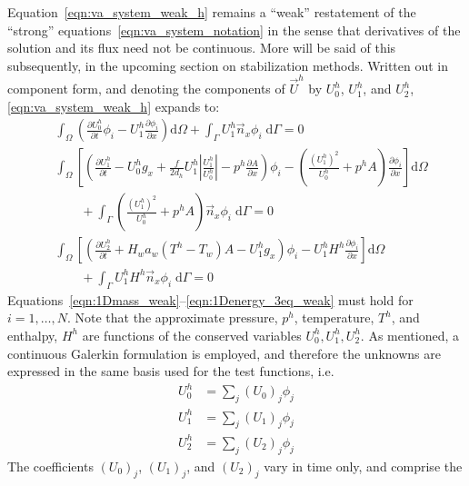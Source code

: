 Equation~\eqref{eqn:va_system_weak_h} remains a ``weak'' restatement of the ``strong'' 
equations~\eqref{eqn:va_system_notation} in the sense that derivatives of the  
solution and its flux need not be continuous. More will be said of this subsequently,
in the upcoming section on stabilization methods.  Written out in component form,
and denoting the components of $\vec{U}^h$ by $U_0^h$, $U_1^h$, and
$U_2^h$, \eqref{eqn:va_system_weak_h} expands to:
\begin{align}
  \label{eqn:1Dmass_weak}
  &
  \int_{\Omega} \left( \frac{\partial U_0^h}{\partial t} \phi_i -
    U_1^h \frac{\partial \phi_i}{\partial x} \right) \text{d}{\Omega}
  + \int_{\Gamma} U_1^h \vec{n}_x \phi_i \; \text{d}{\Gamma} = 0
  \\[12pt]
  \nonumber
  &
  \int_{\Omega} \left[ \left(\frac{\partial U_1^h}{\partial t}
      - U_0^h g_x + \frac{f}{2 d_h}  U_1^h \left|\frac{U_1^h}{U_0^h}\right| - p^h \frac{\partial A}{\partial x} \right) \phi_i
    - \left( \frac{(U_1^h)^2}{U_0^h} + p^hA \right) \frac{\partial\phi_i }{\partial x} \right] \text{d}{\Omega}
  \\
  \label{eqn:1Dmomentum_weak}
  &\qquad + \int_{\Gamma} \left( \frac{(U_1^h)^2}{U_0^h} + p^hA \right) \vec{n}_x \phi_i \; \text{d}{\Gamma} = 0
  \\[12pt]
  \nonumber
  &
  \int_{\Omega}
  \left[
  \left(
    \frac{\partial U_2^h}{\partial t} + H_w a_w (T^h-T_w) A - U_1^h g_x
  \right)
  \phi_i
    -  U_1^h H^h \frac{\partial \phi_i}{\partial x}
  \right]
  \text{d}{\Omega}
  \\
  \label{eqn:1Denergy_3eq_weak}
  &\qquad
  +
  \int_{\Gamma} U_1^h H^h \vec{n}_x \phi_i \; \text{d}{\Gamma} = 0
\end{align}
Equations~\eqref{eqn:1Dmass_weak}--\eqref{eqn:1Denergy_3eq_weak} must
hold for $i=1,\ldots,N$.  Note that the approximate pressure, $p^h$,
temperature, $T^h$, and enthalpy, $H^h$ are functions of the conserved
variables $U_0^h, U_1^h, U_2^h$.  As mentioned, a continuous
Galerkin formulation is employed, and therefore the unknowns are expressed in
the same basis used for the test functions, i.e.
\begin{align}
  U_0^h &= \sum_j (U_0)_j \phi_j
  \\
  U_1^h &= \sum_j (U_1)_j \phi_j
  \\
  U_2^h &= \sum_j (U_2)_j \phi_j
\end{align}
The coefficients $(U_0)_j$, $(U_1)_j$, and $(U_2)_j$ vary in time only, and comprise the
